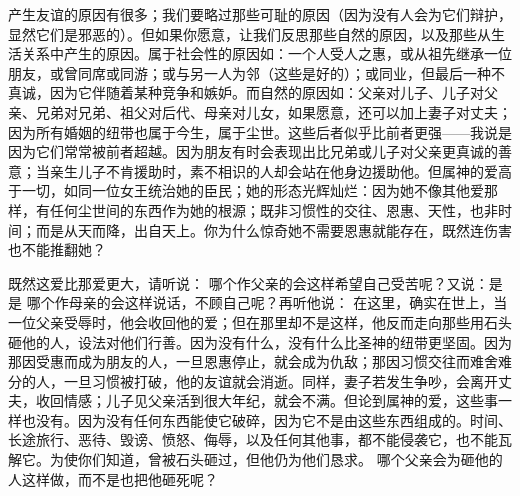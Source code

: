 产生友谊的原因有很多；我们要略过那些可耻的原因（因为没有人会为它们辩护，显然它们是邪恶的）。但如果你愿意，让我们反思那些自然的原因，以及那些从生活关系中产生的原因。属于社会性的原因如：一个人受人之惠，或从祖先继承一位朋友，或曾同席或同游；或与另一人为邻（这些是好的）；或同业，但最后一种不真诚，因为它伴随着某种竞争和嫉妒。而自然的原因如：父亲对儿子、儿子对父亲、兄弟对兄弟、祖父对后代、母亲对儿女，如果愿意，还可以加上妻子对丈夫；因为所有婚姻的纽带也属于今生，属于尘世。这些后者似乎比前者更强——我说是因为它们常常被前者超越。因为朋友有时会表现出比兄弟或儿子对父亲更真诚的善意；当亲生儿子不肯援助时，素不相识的人却会站在他身边援助他。但属神的爱高于一切，如同一位女王统治她的臣民；她的形态光辉灿烂：因为她不像其他爱那样，有任何尘世间的东西作为她的根源；既非习惯性的交往、恩惠、天性，也非时间；而是从天而降，出自天上。你为什么惊奇她不需要恩惠就能存在，既然连伤害也不能推翻她？\par

既然这爱比那爱更大，请听说： 哪个作父亲的会这样希望自己受苦呢？又说：是是 哪个作母亲的会这样说话，不顾自己呢？再听他说： 在这里，确实在世上，当一位父亲受辱时，他会收回他的爱；但在那里却不是这样，他反而走向那些用石头砸他的人，设法对他们行善。因为没有什么，没有什么比圣神的纽带更坚固。因为那因受惠而成为朋友的人，一旦恩惠停止，就会成为仇敌；那因习惯交往而难舍难分的人，一旦习惯被打破，他的友谊就会消逝。同样，妻子若发生争吵，会离开丈夫，收回情感；儿子见父亲活到很大年纪，就会不满。但论到属神的爱，这些事一样也没有。因为没有任何东西能使它破碎，因为它不是由这些东西组成的。时间、长途旅行、恶待、毁谤、愤怒、侮辱，以及任何其他事，都不能侵袭它，也不能瓦解它。为使你们知道，曾被石头砸过，但他仍为他们恳求。 哪个父亲会为砸他的人这样做，而不是也把他砸死呢？\par

